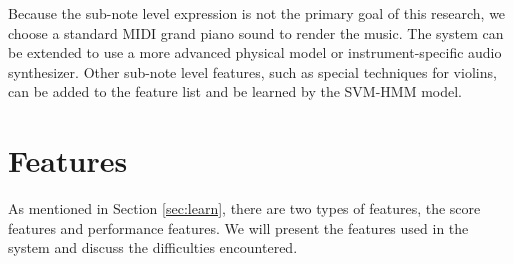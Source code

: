 Because the sub-note level expression is not the primary goal of this research, we choose a standard MIDI grand piano sound to render the music. The system can be extended to use a more advanced physical model or instrument-specific audio synthesizer. Other sub-note level features, such as special techniques for violins, can be added to the feature list and be learned by the SVM-HMM model.
   
\section{Features}\label{sec:features}

   As mentioned in Section \ref{sec:learn}, there are two types of features, the score features and performance features. We will present the features used in the system and discuss the difficulties encountered.
